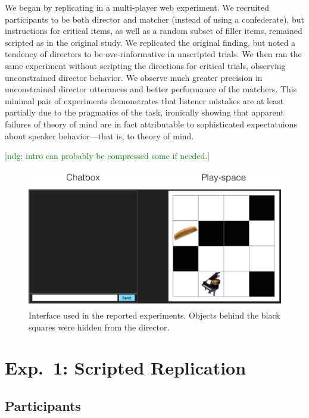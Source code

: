 \documentclass[10pt,letterpaper]{article}
\newcommand{\ndg}[1]{\textcolor{Green}{[ndg: #1]}}
\begin{document}
We began by replicating  in a multi-player web experiment. We recruited participants to be both director and matcher (instead of using a confederate), but instructions for critical items, as well as a random subset of filler items, remained scripted as in the original study. We replicated the original finding, but noted a tendency of directors to be ove-rinformative in unscripted trials. We then ran the same experiment without scripting the directions for critical trials, observing unconstrained director behavior. We observe much greater precision in unconstrained director utterances and better performance of the matchers. This minimal pair of experiments demonstrates that listener mistakes are at least partially due to the pragmatics of the task, ironically showing that apparent failures of theory of mind are in fact attributable to sophisticated expectatuions about speaker behavior---that is, to theory of mind.

\ndg{intro can probably be compressed some if needed.}

\begin{figure}
\begin{center}
\includegraphics[scale = .35]{images/overall_view.jpg}
\end{center}
\vspace{-.25cm}
\caption{Interface used in the reported experiments. Objects behind the black squares were hidden from the director.}
\label{fig:interface}
\end{figure}

\section{Exp.~1: Scripted Replication}
\label{sec:Exp1}

\subsection{Participants}
\end{document}
